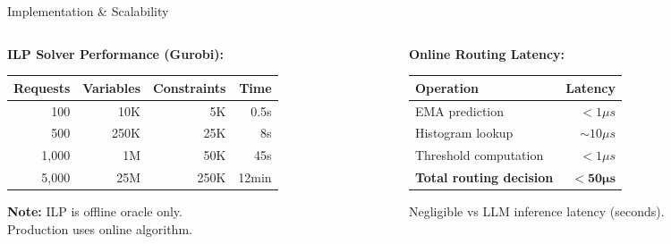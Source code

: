 \documentclass[aspectratio=169,10pt]{beamer}
\begin{document}
\begin{frame}{Implementation \& Scalability}
\begin{columns}[T]
\begin{column}{0.48\textwidth}
\textbf{ILP Solver Performance (Gurobi):}

\vspace{0.2cm}
\footnotesize
\begin{tabular}{@{}rrrr@{}}
\toprule
Requests & Variables & Constraints & Time \\
\midrule
100 & 10K & 5K & 0.5s \\
500 & 250K & 25K & 8s \\
1,000 & 1M & 50K & 45s \\
5,000 & 25M & 250K & 12min \\
\bottomrule
\end{tabular}

\vspace{0.2cm}
\small
\textbf{Note:} ILP is offline oracle only.\\
Production uses online algorithm.
\end{column}

\begin{column}{0.48\textwidth}
\textbf{Online Routing Latency:}

\vspace{0.2cm}
\footnotesize
\begin{tabular}{@{}lr@{}}
\toprule
Operation & Latency \\
\midrule
EMA prediction & $< 1\mu s$ \\
Histogram lookup & $\sim 10\mu s$ \\
Threshold computation & $< 1\mu s$ \\
\textbf{Total routing decision} & $< \mathbf{50\mu s}$ \\
\bottomrule
\end{tabular}

\vspace{0.3cm}
\small
Negligible vs LLM inference latency (seconds).

\vspace{0.3cm}
\end{column}
\end{columns}
\end{frame}
\end{document}
